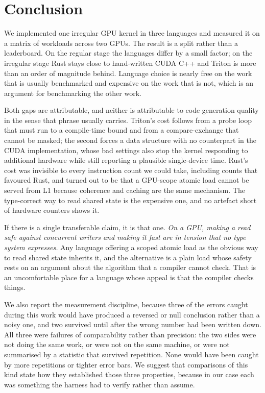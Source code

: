 \documentclass[11pt]{article}
\begin{document}
\section{Conclusion}
\label{sec:conclusion}

We implemented one irregular GPU kernel in three languages and measured it on a
matrix of workloads across two GPUs. The result is a split rather than a
leaderboard. On the regular stage the languages differ by a small factor; on the
irregular stage Rust stays close to hand-written CUDA C++ and Triton is more than
an order of magnitude behind. Language choice is nearly free on the work that is
usually benchmarked and expensive on the work that is not, which is an argument
for benchmarking the other work.

Both gaps are attributable, and neither is attributable to code generation
quality in the sense that phrase usually carries. Triton's cost follows from a
probe loop that must run to a compile-time bound and from a compare-exchange that
cannot be masked; the second forces a data structure with no counterpart in the
CUDA implementation, whose bad settings also stop the kernel responding to
additional hardware while still reporting a plausible single-device time. Rust's
cost was invisible to every instruction count we could take, including counts
that favoured Rust, and turned out to be that a GPU-scope atomic load cannot be
served from L1 because coherence and caching are the same mechanism. The
type-correct way to read shared state is the expensive one, and no artefact
short of hardware counters shows it.

If there is a single transferable claim, it is that one. \emph{On a GPU, making a
read safe against concurrent writers and making it fast are in tension that no
type system expresses.} Any language offering a scoped atomic load as the
obvious way to read shared state inherits it, and the alternative is a plain load
whose safety rests on an argument about the algorithm that a compiler cannot
check. That is an uncomfortable place for a language whose appeal is that the
compiler checks things.

We also report the measurement discipline, because three of the errors caught
during this work would have produced a reversed or null conclusion rather than a
noisy one, and two survived until after the wrong number had been written down.
All three were failures of comparability rather than precision: the two sides
were not doing the same work, or were not on the same machine, or were not
summarised by a statistic that survived repetition. None would have been caught
by more repetitions or tighter error bars. We suggest that comparisons of this
kind state how they established those three properties, because in our case each
was something the harness had to verify rather than assume.
\end{document}
